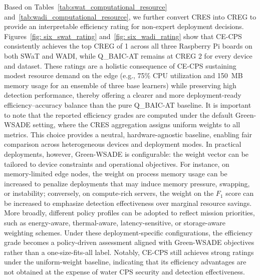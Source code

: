 \documentclass[pdflatex,sn-mathphys-num]{sn-jnl}%
\theoremstyle{thmstyleone}
\theoremstyle{thmstyletwo}%
\theoremstyle{thmstylethree}%
\begin{document}
Based on Tables~\ref{tab:swat_computational_resource} and~\ref{tab:wadi_computational_resource}, we further convert CRES into CREG to provide an interpretable efficiency rating for non-expert deployment decisions.
Figures~\ref{fig: six_swat_rating} and~\ref{fig: six_wadi_rating} show that CE-CPS consistently achieves the top CREG of 1 across all three Raspberry Pi boards on both SWaT and WADI, while Q\_BAIC-AT remains at CREG 2 for every device and dataset. These ratings are a holistic consequence of CE-CPS sustaining modest resource demand on the edge (e.g., 75\% CPU utilization and 150~MB memory usage for an ensemble of three base learners) while preserving high detection performance, thereby offering a clearer and more deployment-ready efficiency--accuracy balance than the pure Q\_BAIC-AT baseline.
It is important to note that the reported efficiency grades are computed under the default Green-WSADE setting, where the CRES aggregation assigns uniform weights to all metrics. This choice provides a neutral, hardware-agnostic baseline, enabling fair comparison across heterogeneous devices and deployment modes. In practical deployments, however, Green-WSADE is configurable: the weight vector can be tailored to device constraints and operational objectives. For instance, on memory-limited edge nodes, the weight on process memory usage can be increased to penalize deployments that may induce memory pressure, swapping, or instability; conversely, on compute-rich servers, the weight on the $F_1$ score can be increased to emphasize detection effectiveness over marginal resource savings. More broadly, different policy profiles can be adopted to reflect mission priorities, such as energy-aware, thermal-aware, latency-sensitive, or storage-aware weighting schemes. Under these deployment-specific configurations, the efficiency grade becomes a policy-driven assessment aligned with Green-WSADE objectives rather than a one-size-fits-all label. Notably, CE-CPS still achieves strong ratings under the uniform-weight baseline, indicating that its efficiency advantages are not obtained at the expense of water CPS security and detection effectiveness.
\end{document}
